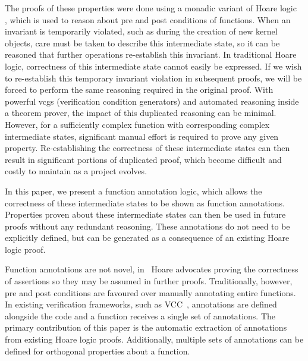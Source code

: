 \documentclass[submission]{eptcs}
\begin{document}
The proofs of these properties were done using a monadic
variant of Hoare logic~\cite{Cock_KS_08}
, which is used to 
reason about pre and post conditions of functions. When an invariant is temporarily
violated, such as during the creation of new kernel objects, care must
be taken to describe this intermediate state, so it can be reasoned
that further operations re-establish this invariant. In 
traditional Hoare logic,
 correctness of this intermediate state cannot easily be expressed. 
If we wish to re-establish this temporary invariant violation in subsequent proofs,
we will be forced to perform the same reasoning required in the original proof.
 With powerful vcgs (verification condition generators)
and automated reasoning inside a theorem prover, the impact
of this duplicated reasoning can be minimal. However, for
a sufficiently complex function with corresponding complex
intermediate states, significant manual effort is required to
prove any given property. Re-establishing the correctness of these
intermediate states can then result in significant portions
of duplicated proof, which become difficult and costly to maintain
as a project evolves.

In this paper, we present a function annotation logic, which
allows the correctness of these intermediate states to be shown
as function annotations. Properties proven
about these intermediate states can then be used in future proofs
without any redundant reasoning. These annotations
do not need to be explicitly defined, but can be generated
as a consequence of an existing Hoare logic proof.

Function annotations are not novel, in~\cite{Hoare:1983:ABC:357980.358001} Hoare advocates proving the correctness of assertions so they
may be assumed in further proofs.
Traditionally, however, pre and post conditions are favoured over
manually annotating entire functions.
In existing verification frameworks, such as VCC~\cite{Cohen_DHLMSST_09}, annotations are
defined alongside the code and a function receives a
single set of annotations. The primary contribution
of this paper is the automatic extraction of
annotations from existing Hoare logic proofs.
Additionally, multiple sets of
annotations can be defined for orthogonal properties about a function.
\end{document}
